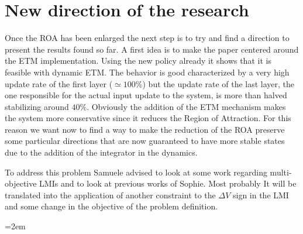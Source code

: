 \documentclass{article}
\begin{document}
\section*{New direction of the research}
Once the ROA has been enlarged the next step is to try and find a direction to present the results found so far. A first idea is to make the paper centered around the ETM implementation. Using the new policy already it shows that it is feasible with dynamic ETM. The behavior is good characterized by a very high update rate of the first layer ($\simeq 100\%$) but the update rate of the last layer, the one responsible for the actual input update to the system, is more than halved stabilizing around $40\%$. Obviously the addition of the ETM mechanism makes the system more conservative since it reduces the Region of Attraction. For this reason we want now to find a way to make the reduction of the ROA preserve some particular directions that are now guaranteed to have more stable states due to the addition of the integrator in the dynamics.

To address this problem Samuele advised to look at some work regarding multi-objective LMIs and to look at previous works of Sophie. Most probably It will be translated into the application of another constraint to the $\Delta V$ sign in the LMI and some change in the objective of the problem definition. 


\pagebreak
\emergencystretch=2em %
\printbibliography
\end{document}
